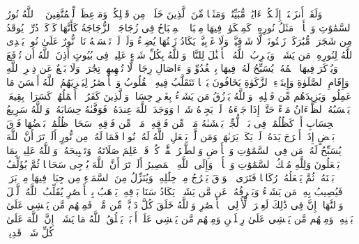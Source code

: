 \stopbuffer%
\startbuffer[\q:24:34]
وَلَقَدۡ أَنزَلۡنَاۤ إِلَیۡكُمۡ ءَایَٰتࣲ مُّبَیِّنَٰتࣲ وَمَثَلࣰا مِّنَ ٱلَّذِینَ خَلَوۡا۟ مِن قَبۡلِكُمۡ وَمَوۡعِظَةࣰ لِّلۡمُتَّقِینَ%
\stopbuffer%
\startbuffer[\q:24:35]
۞ ٱللَّهُ نُورُ ٱلسَّمَٰوَٰتِ وَٱلۡأَرۡضِۚ مَثَلُ نُورِهِۦ كَمِشۡكَوٰةࣲ فِیهَا مِصۡبَاحٌۖ ٱلۡمِصۡبَاحُ فِی زُجَاجَةٍۖ ٱلزُّجَاجَةُ كَأَنَّهَا كَوۡكَبࣱ دُرِّیࣱّ یُوقَدُ مِن شَجَرَةࣲ مُّبَٰرَكَةࣲ زَیۡتُونَةࣲ لَّا شَرۡقِیَّةࣲ وَلَا غَرۡبِیَّةࣲ یَكَادُ زَیۡتُهَا یُضِیۤءُ وَلَوۡ لَمۡ تَمۡسَسۡهُ نَارࣱۚ نُّورٌ عَلَىٰ نُورࣲۚ یَهۡدِی ٱللَّهُ لِنُورِهِۦ مَن یَشَاۤءُۚ وَیَضۡرِبُ ٱللَّهُ ٱلۡأَمۡثَٰلَ لِلنَّاسِۗ وَٱللَّهُ بِكُلِّ شَیۡءٍ عَلِیمࣱ%
\stopbuffer%
\startbuffer[\q:24:36]
فِی بُیُوتٍ أَذِنَ ٱللَّهُ أَن تُرۡفَعَ وَیُذۡكَرَ فِیهَا ٱسۡمُهُۥ یُسَبِّحُ لَهُۥ فِیهَا بِٱلۡغُدُوِّ وَٱلۡءَاصَالِ%
\stopbuffer%
\startbuffer[\q:24:37]
رِجَالࣱ لَّا تُلۡهِیهِمۡ تِجَٰرَةࣱ وَلَا بَیۡعٌ عَن ذِكۡرِ ٱللَّهِ وَإِقَامِ ٱلصَّلَوٰةِ وَإِیتَاۤءِ ٱلزَّكَوٰةِ یَخَافُونَ یَوۡمࣰا تَتَقَلَّبُ فِیهِ ٱلۡقُلُوبُ وَٱلۡأَبۡصَٰرُ%
\stopbuffer%
\startbuffer[\q:24:38]
لِیَجۡزِیَهُمُ ٱللَّهُ أَحۡسَنَ مَا عَمِلُوا۟ وَیَزِیدَهُم مِّن فَضۡلِهِۦۗ وَٱللَّهُ یَرۡزُقُ مَن یَشَاۤءُ بِغَیۡرِ حِسَابࣲ%
\stopbuffer%
\startbuffer[\q:24:39]
وَٱلَّذِینَ كَفَرُوۤا۟ أَعۡمَٰلُهُمۡ كَسَرَابِۭ بِقِیعَةࣲ یَحۡسَبُهُ ٱلظَّمۡءَانُ مَاۤءً حَتَّىٰۤ إِذَا جَاۤءَهُۥ لَمۡ یَجِدۡهُ شَیۡءࣰا وَوَجَدَ ٱللَّهَ عِندَهُۥ فَوَفَّىٰهُ حِسَابَهُۥۗ وَٱللَّهُ سَرِیعُ ٱلۡحِسَابِ%
\stopbuffer%
\startbuffer[\q:24:40]
أَوۡ كَظُلُمَٰتࣲ فِی بَحۡرࣲ لُّجِّیࣲّ یَغۡشَىٰهُ مَوۡجࣱ مِّن فَوۡقِهِۦ مَوۡجࣱ مِّن فَوۡقِهِۦ سَحَابࣱۚ ظُلُمَٰتُۢ بَعۡضُهَا فَوۡقَ بَعۡضٍ إِذَاۤ أَخۡرَجَ یَدَهُۥ لَمۡ یَكَدۡ یَرَىٰهَاۗ وَمَن لَّمۡ یَجۡعَلِ ٱللَّهُ لَهُۥ نُورࣰا فَمَا لَهُۥ مِن نُّورٍ%
\stopbuffer%
\startbuffer[\q:24:41]
أَلَمۡ تَرَ أَنَّ ٱللَّهَ یُسَبِّحُ لَهُۥ مَن فِی ٱلسَّمَٰوَٰتِ وَٱلۡأَرۡضِ وَٱلطَّیۡرُ صَٰۤفَّٰتࣲۖ كُلࣱّ قَدۡ عَلِمَ صَلَاتَهُۥ وَتَسۡبِیحَهُۥۗ وَٱللَّهُ عَلِیمُۢ بِمَا یَفۡعَلُونَ%
\stopbuffer%
\startbuffer[\q:24:42]
وَلِلَّهِ مُلۡكُ ٱلسَّمَٰوَٰتِ وَٱلۡأَرۡضِۖ وَإِلَى ٱللَّهِ ٱلۡمَصِیرُ%
\stopbuffer%
\startbuffer[\q:24:43]
أَلَمۡ تَرَ أَنَّ ٱللَّهَ یُزۡجِی سَحَابࣰا ثُمَّ یُؤَلِّفُ بَیۡنَهُۥ ثُمَّ یَجۡعَلُهُۥ رُكَامࣰا فَتَرَى ٱلۡوَدۡقَ یَخۡرُجُ مِنۡ خِلَٰلِهِۦ وَیُنَزِّلُ مِنَ ٱلسَّمَاۤءِ مِن جِبَالࣲ فِیهَا مِنۢ بَرَدࣲ فَیُصِیبُ بِهِۦ مَن یَشَاۤءُ وَیَصۡرِفُهُۥ عَن مَّن یَشَاۤءُۖ یَكَادُ سَنَا بَرۡقِهِۦ یَذۡهَبُ بِٱلۡأَبۡصَٰرِ%
\stopbuffer%
\startbuffer[\q:24:44]
یُقَلِّبُ ٱللَّهُ ٱلَّیۡلَ وَٱلنَّهَارَۚ إِنَّ فِی ذَٰلِكَ لَعِبۡرَةࣰ لِّأُو۟لِی ٱلۡأَبۡصَٰرِ%
\stopbuffer%
\startbuffer[\q:24:45]
وَٱللَّهُ خَلَقَ كُلَّ دَاۤبَّةࣲ مِّن مَّاۤءࣲۖ فَمِنۡهُم مَّن یَمۡشِی عَلَىٰ بَطۡنِهِۦ وَمِنۡهُم مَّن یَمۡشِی عَلَىٰ رِجۡلَیۡنِ وَمِنۡهُم مَّن یَمۡشِی عَلَىٰۤ أَرۡبَعࣲۚ یَخۡلُقُ ٱللَّهُ مَا یَشَاۤءُۚ إِنَّ ٱللَّهَ عَلَىٰ كُلِّ شَیۡءࣲ قَدِیرࣱ%
